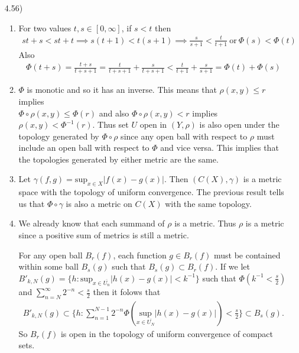 \documentclass[11pt,letter]{article}
\begin{document}
\begin{enumerate}
    \item [4.56)]\begin{enumerate}
        \item For two values $t,s \in [0,\infty]$, if $s < t$ then
        \begin{align*}
            st + s < st + t \implies s(t+1) < t(s+1) \implies \frac{s}{s+1} < \frac{t}{t+1} \ \text{or} \ \Phi(s) < \Phi(t)
        \end{align*}
        Also
        \begin{align*}
            \Phi(t + s) = \frac{t+s}{t+s+1} = \frac{t}{t+s+1} + \frac{s}{t+s+1} < \frac{t}{t+1} + \frac{s}{s+1} = \Phi(t) + \Phi(s)
        \end{align*}
        
        \item $\Phi$ is monotic and so it has an inverse. This means that $\rho(x,y) \le r$ implies \\$\Phi \circ \rho(x,y) \le \Phi(r)$ and also $\Phi \circ \rho (x,y) < r$ implies $\rho(x,y) < \Phi^{-1}(r)$. Thus set $U$ open in $(Y,\rho)$ is also open under the topology generated by $\Phi \circ \rho$ since any open ball with respect to $\rho$ must include an open ball with respect to $\Phi$ and vice versa. This implies that the topologies generated by either metric are the same.
        
        \item Let $\gamma(f,g) = \text{sup}_{x\in X} \vert f(x) - g(x) \vert$. Then $(C(X),\gamma)$ is a metric space with the topology of uniform convergence. The previous result tells us that $\Phi \circ \gamma$ is also a metric on $C(X)$ with the same topology.
        
        \item We already know that each summand of $\rho$ is a metric. Thus $\rho$ is a metric since a positive sum of metrics is still a metric.
        
        For any open ball $B_r(f)$, each function $g \in B_r(f)$ must be contained within some ball $B_s(g)$ such that $B_s(g) \subset B_r(f)$. If we let $B'_{k,N}(g) = \{h: \text{sup}_{x \in \overline{U_n}}\vert h(x) - g(x) \vert < k^{-1} \}$ such that $\Phi(k^{-1} < \frac{s}{2})$ and $\sum_{n=N}^\infty 2^{-n} < \frac{s}{2}$ then it folows that
        \begin{align*}
            B'_{k,N}(g) \subset \{h: \sum_{n=1}^{N-1} 2^{-n} \Phi(\underset{x \in \overline{U_N}}{\text{sup}}\vert h(x) - g(x) \vert) < \frac{s}{2} \} \subset B_s(g).
        \end{align*}
        So $B_r(f)$ is open in the topology of uniform convergence of compact sets.


\end{enumerate}
\end{enumerate}
\end{document}
